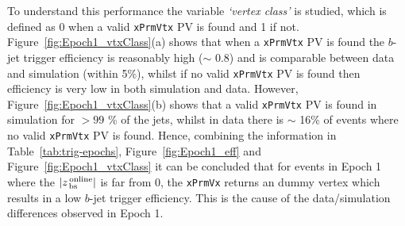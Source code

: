 To understand this performance the variable \textit{`vertex class'} is studied, which is defined as 0 when a valid \verb|xPrmVtx| PV is found and 1 if not.
Figure~\ref{fig:Epoch1_vtxClass}(a) shows that when a \verb|xPrmVtx| PV is found the $b$-jet trigger efficiency is reasonably high ($\sim$ 0.8)
and is comparable between data and simulation (within 5\%),
whilst if no valid \verb|xPrmVtx| PV is found then efficiency is very low in both simulation and data.
However, Figure~\ref{fig:Epoch1_vtxClass}(b) shows that a valid \verb|xPrmVtx| PV is found in simulation for $> 99$ \% of the jets,
whilst in data there is $\sim$ 16\% of events where no valid \verb|xPrmVtx| PV is found.
Hence, combining the information in Table~\ref{tab:trig-epochs}, Figure~\ref{fig:Epoch1_eff} and Figure~\ref{fig:Epoch1_vtxClass}
it can be concluded that for events in  Epoch 1 where the  $|z_{\,\text{bs}}^{\text{\,online}}|$ is far from 0,
the \verb|xPrmVx| returns an dummy vertex which results in a low $b$-jet trigger efficiency.
This is the cause of the data/simulation differences observed in Epoch 1. 



